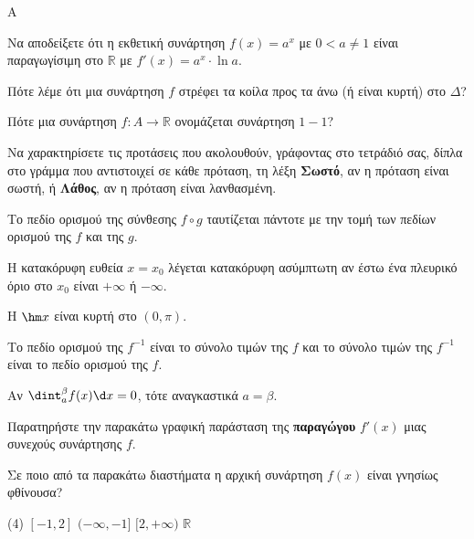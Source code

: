 \begin{thema}{A}
\begin{erwthma}
    \item Να αποδείξετε ότι η εκθετική συνάρτηση $ f(x)=a^x $ με $ 0<a\neq 1 $ είναι παραγωγίσιμη στο $ \mathbb{R} $ με $ f'(x)=a^x\cdot\ln{a} $.
    \item Πότε λέμε ότι μια συνάρτηση $f$ στρέφει τα κοίλα προς τα άνω (ή είναι κυρτή) στο $\Delta$?
    \item Πότε μια συνάρτηση $f:A\to\mathbb{R}$ ονομάζεται συνάρτηση $1-1$?
    \item Να χαρακτηρίσετε τις προτάσεις που ακολουθούν, γράφοντας στο τετράδιό σας, δίπλα στο γράμμα που αντιστοιχεί σε κάθε πρόταση, τη λέξη \textbf{Σωστό}, αν η πρόταση είναι σωστή, ή \textbf{Λάθος}, αν η πρόταση είναι λανθασμένη.
    \begin{alist}
        \item Το πεδίο ορισμού της σύνθεσης $f \circ g$ ταυτίζεται πάντοτε με την τομή των πεδίων ορισμού της $f$ και της $g$.
        \item Η κατακόρυφη ευθεία $x=x_0$ λέγεται κατακόρυφη ασύμπτωτη αν έστω ένα πλευρικό όριο στο $x_0$ είναι $+\infty$ ή $-\infty$.
        \item Η $\hm x$ είναι κυρτή στο $(0, \pi)$.
        \item Το πεδίο ορισμού της $f^{-1}$ είναι το σύνολο τιμών της $f$ και το σύνολο τιμών της $f^{-1}$ είναι το πεδίο ορισμού της $f$.
        \item Αν $\dint_a^\beta f(x)\d x = 0$, τότε αναγκαστικά $a = \beta$.
    \end{alist}
    \item Παρατηρήστε την παρακάτω γραφική παράσταση της \textbf{παραγώγου} $f'(x)$ μιας συνεχούς συνάρτησης $f$.
    \begin{center}
    \end{center}
    Σε ποιο από τα παρακάτω διαστήματα η αρχική συνάρτηση $f(x)$ είναι γνησίως φθίνουσα?
    \begin{tasks}[label=\let\textdexiakeraia\relax\alph*.](4)
        \task $[ -1, 2 ]$
        \task $(-\infty, -1]$
        \task $[2, +\infty)$
        \task $\mathbb{R}$
    \end{tasks}
\end{erwthma}
\end{thema}


